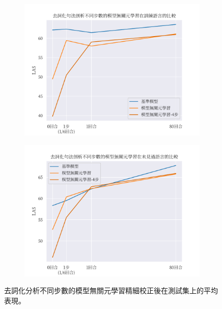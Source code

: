 \begin{figure}[!htbp]
    \centering
    \vspace{30pt}
    \begin{subfigure}[b]{0.8\textwidth}
        \centering
        \includegraphics[width=\textwidth]{figs/chapter3/delex/delex_maml_train_langs.pdf}
    \end{subfigure}
    \begin{subfigure}[b]{0.8\textwidth}
        \centering
        \includegraphics[width=\textwidth]{figs/chapter3/delex/delex_maml_test_langs.pdf}
    \end{subfigure}
    \caption{去詞化分析不同步數的模型無關元學習精細校正後在測試集上的平均表現。}
    \label{fig:delex_avg}
\end{figure}